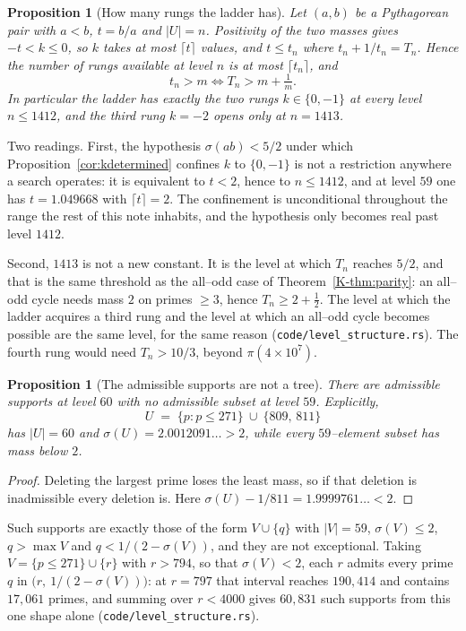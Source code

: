 \documentclass[11pt]{article}
\newtheorem{proposition}[theorem]{Proposition}
\theoremstyle{definition}
\begin{document}
\begin{proposition}[How many rungs the ladder has]\label{prop:rungcount}
Let $(a,b)$ be a Pythagorean pair with $a<b$, $t=b/a$ and $|U|=n$. Positivity of the two masses gives
$-t<k\le0$, so $k$ takes at most $\lceil t\rceil$ values, and $t\le t_n$ where $t_n+1/t_n=T_n$. Hence
the number of rungs available at level $n$ is at most $\lceil t_n\rceil$, and
\[ t_n>m\iff T_n>m+\tfrac1m . \]
In particular the ladder has exactly the two rungs $k\in\{0,-1\}$ at every level $n\le1412$, and the
third rung $k=-2$ opens only at $n=1413$.
\end{proposition}

Two readings. First, the hypothesis $\sigma(ab)<5/2$ under which
Proposition~\ref{cor:kdetermined} confines $k$ to $\{0,-1\}$ is not a restriction anywhere a search
operates: it is equivalent to $t<2$, hence to $n\le1412$, and at level $59$ one has $t=1.049668$ with
$\lceil t\rceil=2$. The confinement is unconditional throughout the range the rest of this note
inhabits, and the hypothesis only becomes real past level $1412$.

Second, $1413$ is not a new constant. It is the level at which $T_n$ reaches $5/2$, and that is the
same threshold as the all--odd case of Theorem~\ref{K-thm:parity}: an all--odd cycle needs mass $2$ on
primes $\ge3$, hence $T_n\ge2+\tfrac12$. The level at which the ladder acquires a third rung and the
level at which an all--odd cycle becomes possible are the same level, for the same reason
\textup{(\texttt{code/level\_structure.rs})}. The fourth rung would need $T_n>10/3$, beyond
$\pi(4\times10^{7})$.

\begin{proposition}[The admissible supports are not a tree]\label{prop:nottree}
There are admissible supports at level $60$ with no admissible subset at level $59$. Explicitly,
\[ U\;=\;\{p:p\le271\}\ \cup\ \{809,\,811\} \]
has $|U|=60$ and $\sigma(U)=2.0012091\ldots>2$, while every $59$--element subset has mass below $2$.
\end{proposition}
\begin{proof}
Deleting the largest prime loses the least mass, so if that deletion is inadmissible every deletion
is. Here $\sigma(U)-1/811=1.9999761\ldots<2$.
\end{proof}

Such supports are exactly those of the form $V\cup\{q\}$ with $|V|=59$, $\sigma(V)\le2$,
$q>\max V$ and $q<1/(2-\sigma(V))$, and they are not exceptional. Taking $V=\{p\le271\}\cup\{r\}$
with $r>794$, so that $\sigma(V)<2$, each $r$ admits every prime $q$ in
$\bigl(r,\ 1/(2-\sigma(V))\bigr)$: at $r=797$ that interval reaches $190{,}414$ and contains
$17{,}061$ primes, and summing over $r<4000$ gives $60{,}831$ such supports from this one shape alone
\textup{(\texttt{code/level\_structure.rs})}.
\end{document}
